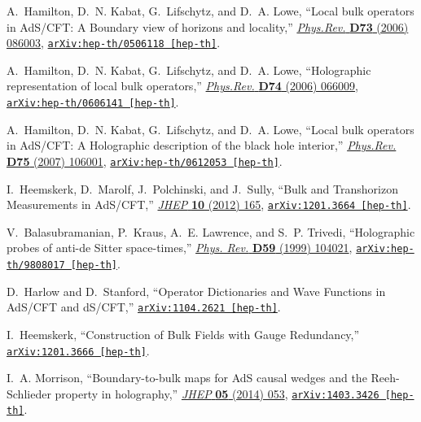 \begin{thebibliography}{100}
A.~Hamilton, D.~N. Kabat, G.~Lifschytz, and D.~A. Lowe, ``{Local bulk operators
  in AdS/CFT: A Boundary view of horizons and locality},''
  \href{http://dx.doi.org/10.1103/PhysRevD.73.086003}{{\em Phys.Rev.} {\bf D73}
  (2006)  086003},
\href{http://arxiv.org/abs/hep-th/0506118}{{\tt arXiv:hep-th/0506118
  [hep-th]}}.

A.~Hamilton, D.~N. Kabat, G.~Lifschytz, and D.~A. Lowe, ``{Holographic
  representation of local bulk operators},''
  \href{http://dx.doi.org/10.1103/PhysRevD.74.066009}{{\em Phys.Rev.} {\bf D74}
  (2006)  066009},
\href{http://arxiv.org/abs/hep-th/0606141}{{\tt arXiv:hep-th/0606141
  [hep-th]}}.

A.~Hamilton, D.~N. Kabat, G.~Lifschytz, and D.~A. Lowe, ``{Local bulk operators
  in AdS/CFT: A Holographic description of the black hole interior},''
  \href{http://dx.doi.org/10.1103/PhysRevD.75.106001,
  10.1103/PhysRevD.75.129902}{{\em Phys.Rev.} {\bf D75} (2007)  106001},
\href{http://arxiv.org/abs/hep-th/0612053}{{\tt arXiv:hep-th/0612053
  [hep-th]}}.

I.~Heemskerk, D.~Marolf, J.~Polchinski, and J.~Sully, ``{Bulk and Transhorizon
  Measurements in AdS/CFT},''
  \href{http://dx.doi.org/10.1007/JHEP10(2012)165}{{\em JHEP} {\bf 10} (2012)
  165},
\href{http://arxiv.org/abs/1201.3664}{{\tt arXiv:1201.3664 [hep-th]}}.

V.~Balasubramanian, P.~Kraus, A.~E. Lawrence, and S.~P. Trivedi, ``{Holographic
  probes of anti-de Sitter space-times},''
  \href{http://dx.doi.org/10.1103/PhysRevD.59.104021}{{\em Phys. Rev.} {\bf
  D59} (1999)  104021},
\href{http://arxiv.org/abs/hep-th/9808017}{{\tt arXiv:hep-th/9808017
  [hep-th]}}.

D.~Harlow and D.~Stanford, ``{Operator Dictionaries and Wave Functions in
  AdS/CFT and dS/CFT},''
\href{http://arxiv.org/abs/1104.2621}{{\tt arXiv:1104.2621 [hep-th]}}.

I.~Heemskerk, ``{Construction of Bulk Fields with Gauge Redundancy},''
\href{http://arxiv.org/abs/1201.3666}{{\tt arXiv:1201.3666 [hep-th]}}.

I.~A. Morrison, ``{Boundary-to-bulk maps for AdS causal wedges and the
  Reeh-Schlieder property in holography},''
  \href{http://dx.doi.org/10.1007/JHEP05(2014)053}{{\em JHEP} {\bf 05} (2014)
  053},
\href{http://arxiv.org/abs/1403.3426}{{\tt arXiv:1403.3426 [hep-th]}}.


\end{thebibliography}
